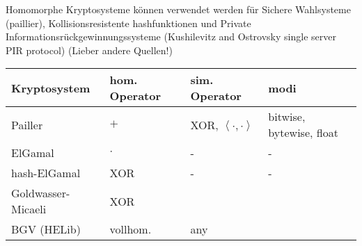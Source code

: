 Homomorphe Kryptosysteme können verwendet werden für Sichere Wahlsysteme (paillier), Kollisionsresistente hashfunktionen und Private Informationsrückgewinnungssysteme (Kushilevitz and Ostrovsky single server PIR protocol)
\cite[p.228]{maimut2012homomorphic} (Lieber andere Quellen!)

\begin{center}
	\begin{tabular}{ | l | l | l | p{5cm} |}
		\hline
		Kryptosystem & hom. Operator & sim. Operator & modi \\ \hline
		Pailler & $+$ & XOR, $\left\langle\cdot,\cdot \right\rangle$  & bitwise, bytewise, float \\ \hline
		ElGamal & $\cdot$ & -  & - \\ \hline
		hash-ElGamal & XOR &  - & - \\ \hline
		Goldwasser-Micaeli & XOR & & \\ \hline
		BGV (HELib) & vollhom. & any& \\ \hline
	\end{tabular}
\end{center}